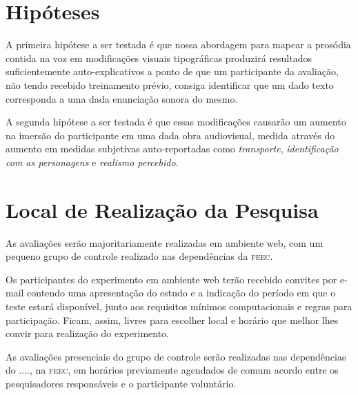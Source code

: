 \documentclass[a4paper,11pt,titlepage,singlespacing]{article}
\begin{document}
\section{Hipóteses}

\noindent A primeira hipótese a ser testada é que nossa abordagem para mapear a prosódia contida na voz em modificações visuais tipográficas produzirá resultados suficientemente auto-explicativos a ponto de que um participante da avaliação, não tendo recebido treinamento prévio, consiga identificar que um dado texto corresponda a uma dada enunciação sonora do mesmo.

A segunda hipótese a ser testada é que essas modificações causarão um aumento na imersão do participante em uma dada obra audiovisual, medida através do aumento em medidas subjetivas auto-reportadas como \textit{transporte}, \textit{identificação com as personagens} e \textit{realismo percebido}.



\section{Local de Realização da Pesquisa}

\noindent As avaliações serão majoritariamente realizadas em ambiente web, com um pequeno grupo de controle realizado nas dependências da \textsc{feec}. 

Os participantes do experimento em ambiente web terão recebido convites por e-mail contendo uma apresentação do estudo e a indicação do período em que o teste estará disponível, junto aos requisitos mínimos computacionais e regras para participação. Ficam, assim, livres para escolher local e horário que melhor lhes convir para realização do experimento.

As avaliações presenciais do grupo de controle serão realizadas nas dependências do ...., na \textsc{feec}, em horários previamente agendados de comum acordo entre os pesquisadores responsáveis e o participante voluntário.
\end{document}
